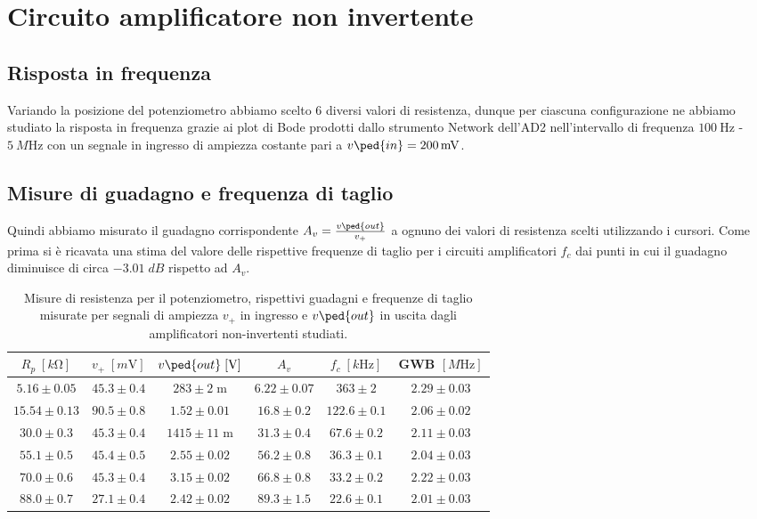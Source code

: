 \documentclass[10pt, a4paper, italian]{article}
\begin{document}
\section{Circuito amplificatore non invertente}
\subsection{Risposta in frequenza}
Variando la posizione del potenziometro abbiamo scelto 6 diversi valori di
resistenza, dunque per ciascuna configurazione ne abbiamo studiato la risposta
in frequenza grazie ai plot di Bode prodotti dallo strumento Network dell'AD2
nell'intervallo di frequenza $\SI{100}{\Hz}$ - $\SI{5}{M\Hz}$ con un segnale
in ingresso di ampiezza costante pari a $v\ped{in} = \SI{200}{m\V}$.

\subsection{Misure di guadagno e frequenza di taglio}
Quindi abbiamo misurato il guadagno corrispondente
$A_v = \frac{v\ped{out}}{v_+}$ a ognuno dei valori di resistenza scelti
utilizzando i cursori.
Come prima si è ricavata una stima del valore delle rispettive frequenze di
taglio per i circuiti amplificatori $f_c$ dai punti in cui il guadagno
diminuisce di circa $-3.01 \; \si{dB}$ rispetto ad $A_v$. 
\begin{table}[htbp]
\centering
\begin{tabular}{cccccc}
\toprule
$R_p \; [\si{k\ohm}]$ & $v_+ \; [\si{m\V}]$ & $v\ped{out} \; [\si{\V}]$ & $A_v$ &
$f_c \; [\si{k\Hz}]$ & GWB $[\si{M\Hz}]$ \\
\midrule
\midrule
$5.16 \pm 0.05$ & $45.3 \pm 0.4$ & $283 \pm 2 \;$m & $6.22 \pm 0.07$ &
$363 \pm 2$ & $2.29 \pm 0.03$ \\
$15.54 \pm 0.13$ & $90.5 \pm 0.8$ & $1.52 \pm 0.01$ & $16.8 \pm 0.2$ &
$122.6 \pm 0.1$  & $2.06 \pm 0.02$ \\
$30.0 \pm 0.3$ & $45.3 \pm 0.4$  & $1415 \pm 11\;$m & $31.3 \pm 0.4$ &
$67.6 \pm 0.2$ & $2.11 \pm 0.03$ \\
$55.1 \pm 0.5$   & $45.4 \pm 0.5$ & $2.55 \pm 0.02$ & $56.2 \pm 0.8$ &
$36.3 \pm 0.1$ &  $2.04 \pm 0.03$ \\
$70.0 \pm 0.6$ & $45.3 \pm 0.4$ & $3.15 \pm 0.02$ & $66.8 \pm 0.8$ 	 &
$33.2 \pm 0.2$ & $2.22 \pm 0.03$ \\
$88.0 \pm 0.7$   & $27.1 \pm 0.4$ & $2.42 \pm 0.02$ & $89.3 \pm 1.5$ &
$22.6 \pm 0.1$ & $2.01 \pm 0.03$ \\
\bottomrule     
\end{tabular}
\caption{Misure di resistenza per il potenziometro, rispettivi guadagni e
frequenze di taglio misurate per segnali di ampiezza $v_+$ in ingresso e
$v\ped{out}$ in uscita dagli amplificatori non-invertenti studiati.
\label{tab: ampmes}}
\end{table}
\end{document}
